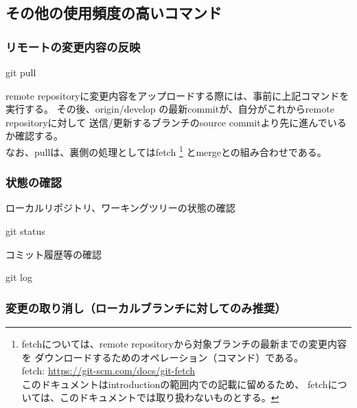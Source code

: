 \documentclass[10pt,a4j,openany,dvipdfmx]{jsarticle}
\begin{document}


\subsection{その他の使用頻度の高いコマンド} %
\label{sub:その他の使用頻度の高いコマンド}

\subsubsection{リモートの変更内容の反映} %
\label{ssub:リモートの変更内容の反映}


\begin{commandshell}
git pull
\end{commandshell}
remote repositoryに変更内容をアップロードする際には、事前に上記コマンドを実行する。
その後、origin/develop の最新commitが、自分がこれからremote repositoryに対して
送信/更新するブランチのsource commitより先に進んでいるか確認する。\\
なお、pullは、裏側の処理としてはfetch
\footnote{
fetchについては、remote repositoryから対象ブランチの最新までの変更内容を
ダウンロードするためのオペレーション（コマンド）である。\\
fetch: \url{https://git-scm.com/docs/git-fetch}\\
このドキュメントはintroductionの範囲内での記載に留めるため、
fetchについては、このドキュメントでは取り扱わないものとする。
}
とmergeとの組み合わせである。

\subsubsection{状態の確認} %
\label{ssub:状態の確認}

ローカルリポジトリ、ワーキングツリーの状態の確認
\begin{commandshell}
git status
\end{commandshell}

コミット履歴等の確認
\begin{commandshell}
git log
\end{commandshell}

\subsubsection{変更の取り消し（ローカルブランチに対してのみ推奨）} %
\label{ssub:変更の取り消し_ローカルブランチに対してのみ推奨_}
\end{document}
